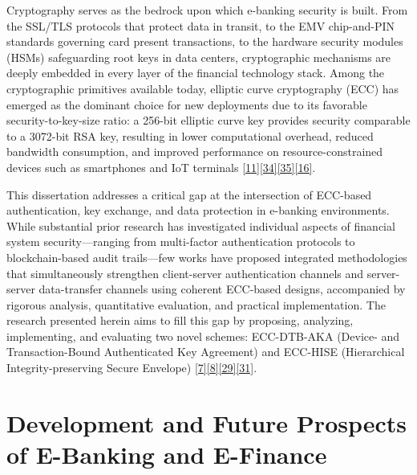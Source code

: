 \indent Cryptography serves as the bedrock upon which e-banking security is built. From the SSL/TLS protocols that protect data in transit, to the EMV chip-and-PIN standards governing card present transactions, to the hardware security modules (HSMs) safeguarding root keys in data centers, cryptographic mechanisms are deeply embedded in every layer of the financial technology stack. Among the cryptographic primitives available today, elliptic curve cryptography (ECC) has emerged as the dominant choice for new deployments due to its favorable security-to-key-size ratio: a 256-bit elliptic curve key provides security comparable to a 3072-bit RSA key, resulting in lower computational overhead, reduced bandwidth consumption, and improved performance on resource-constrained devices such as smartphones and IoT terminals \hyperref[ref:11]{[11]}\hyperref[ref:34]{[34]}\hyperref[ref:35]{[35]}\hyperref[ref:16]{[16]}.

\indent This dissertation addresses a critical gap at the intersection of ECC-based authentication, key exchange, and data protection in e-banking environments. While substantial prior research has investigated individual aspects of financial system security---ranging from multi-factor authentication protocols to blockchain-based audit trails---few works have proposed integrated methodologies that simultaneously strengthen client-server authentication channels and server-server data-transfer channels using coherent ECC-based designs, accompanied by rigorous analysis, quantitative evaluation, and practical implementation. The research presented herein aims to fill this gap by proposing, analyzing, implementing, and evaluating two novel schemes: ECC-DTB-AKA (Device- and Transaction-Bound Authenticated Key Agreement) and ECC-HISE (Hierarchical Integrity-preserving Secure Envelope) \hyperref[ref:7]{[7]}\hyperref[ref:8]{[8]}\hyperref[ref:29]{[29]}\hyperref[ref:31]{[31]}.

\section{Development and Future Prospects of E-Banking and E-Finance}

